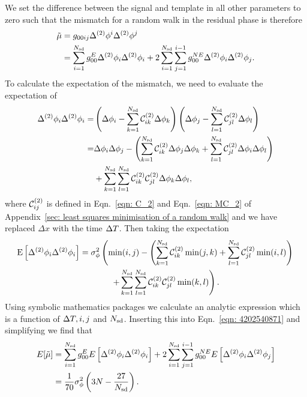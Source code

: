 \documentclass[../full_thesis/full_thesis.tex]{subfiles}
\begin{document}
We set the difference between the signal and template in all other parameters
to zero such that the mismatch for a random walk in the residual phase is
therefore
\begin{align}
\tilde{\mu} & = g_{0 0 i j} \Delta^{(2)}\phi^{i}\Delta^{(2)}\phi^{j} \\
& = \sum_{i=1}^{N_{\textrm{sd}}}g_{00}^{E} \Delta^{(2)}\phi_{i}\Delta^{(2)}\phi_{i}
+ 2 \sum_{i=1}^{N_{\textrm{sd}}}\sum_{j=1}^{i-1}g_{00}^{NE}\Delta^{(2)}\phi_{i}\Delta^{(2)}\phi_{j}.
\label{eqn: 4202540871}
\end{align}
To calculate the expectation of the mismatch, we need to evaluate the
expectation of
\begin{align}
\Delta^{(2)}\phi_{i}\Delta^{(2)}\phi_{i} = & \left(\Delta\phi_{i}
- \sum_{k=1}^{N_{\textrm{sd}}}\mathcal{C}^{(2)}_{ik}\Delta\phi_{k}\right)
 \left(\Delta\phi_{j} - \sum_{l=1}^{N_{\textrm{sd}}}\mathcal{C}^{(2)}_{jl}\Delta\phi_{l}\right) \\
= & \Delta\phi_{i}\Delta\phi_{j} -
\left(\sum_{k=1}^{N_{\textrm{sd}}}\mathcal{C}^{(2)}_{ik} \Delta\phi_{j}\Delta\phi_{k}
+ \sum_{l=1}^{N_{\textrm{sd}}}\mathcal{C}^{(2)}_{jl}\Delta\phi_{i}\Delta\phi_{l}\right) \nonumber \\
& +
\sum_{k=1}^{N_{\textrm{sd}}}\sum_{l=1}^{N_{\textrm{sd}}}\mathcal{C}^{(2)}_{ik}\mathcal{C}^{(2)}_{jl} \Delta\phi_{k}\Delta\phi_{l},
\end{align}
where $\mathcal{C}^{(2)}_{ij}$ is defined in Eqn.~\ref{eqn: C_2} and Eqn.~\ref{eqn: MC_2}
of Appendix~\ref{sec: least squares minimisation of a random walk} and we have
replaced $\Delta x$ with the time $\Delta T$. Then taking the expectation
\begin{align}
\E{\Delta^{(2)}\phi_{i}\Delta^{(2)}\phi_{i}} & =
\sigma^{2}_{\phi} \left(\min(i, j) - \left(\s{k=1}{\Nsd}\CT_{ik} \min(j, k)
+ \s{l=1}{\Nsd}\CT_{jl}\min(i, l) \right)\right. \notag \\
& \hspace{13mm} \left. + \s{k=1}{\Nsd}\s{l=1}{\Nsd}\CT_{ik}\CT_{jl}\min(k, l)\right).
\label{eqn: expected mismatch dP0idP0j_k2}
\end{align}
Using symbolic mathematics packages we
calculate an analytic expression which is a function of $\Delta T, i, j$ and $N_{\textrm{sd}}$.
Inserting this into Eqn.~\eqref{eqn: 4202540871} and simplifying we find that
\begin{align}
E[\tilde{\mu}]  & = \sum_{i=1}^{N_{\textrm{sd}}}g_{00}^{E} E\left[\Delta^{(2)}\phi_{i}\Delta^{(2)}\phi_{i}\right]
+ 2 \sum_{i=1}^{N_{\textrm{sd}}}\sum_{j=1}^{i-1}g_{00}^{NE}E\left[\Delta^{(2)}\phi_{i}\Delta^{(2)}\phi_{j}\right]  \\
& = \frac{1}{70}\sigma_{\phi}^{2}\left(3N - \frac{27}{N_{\textrm{sd}}}\right).
\label{eqn: Expected mismatch RW in phase k2}
\end{align}
\end{document}

